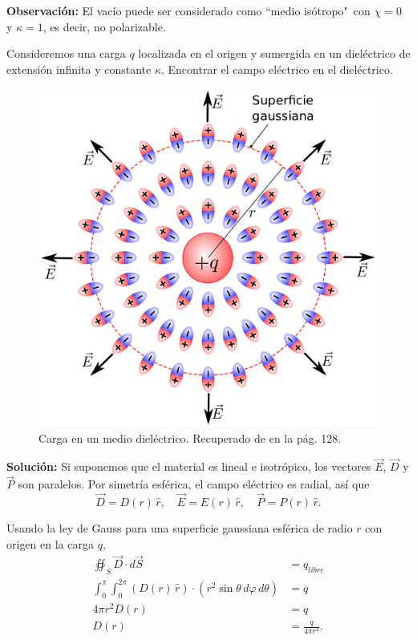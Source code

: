 \textbf{Observación:} El vacío puede ser considerado como ``medio isótropo"\, con $\chi = 0$ y $\kappa = 1$, es decir, no polarizable.

\begin{ejemplo}
    Consideremos una carga $q$ localizada en el origen y sumergida en un dieléctrico de extensión infinita y constante $\kappa$. Encontrar el campo eléctrico en el dieléctrico.

    \begin{figure}[H]
        \centering
        \includegraphics[scale = 0.55]{Figuras/Ej-Isotropico.png}
        \caption{Carga en un medio dieléctrico. 
 Recuperado de \cite{Alvarez} en la pág. 128. }
        \label{fig:Carga-Dielectrico}
    \end{figure}

    \textbf{Solución:} Si suponemos que el material es lineal e isotrópico, los vectores $\Vec{E}$, $\Vec{D}$ y $\Vec{P}$ son paralelos. Por simetría esférica, el campo eléctrico es radial, así que
    $$\Vec{D} = D(r)  \,\hat{r}, \quad \Vec{E} = E(r) \,\hat{r}, \quad \Vec{P} = P(r) \,\hat{r}.$$

    Usando la ley de Gauss para una superficie gaussiana esférica de radio $r$ con origen en la carga $q$,
    \begin{align*}
       \oiint_S \Vec{D} \cdot d\Vec{S} &= q_{libre} \\
       \int_0^{\pi} \int_0^{2\pi} (D(r) \,\hat{r}) \cdot (r^2 \sin \theta \,d\varphi \,d\theta) &= q \\
       4\pi r^2 D(r) &= q \\
       D(r) &= \frac{q}{4\pi r^2}.
    \end{align*}


\end{ejemplo}
